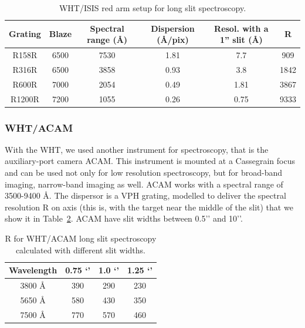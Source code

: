 \begin{table}
\begin{center}
\caption{WHT/ISIS red arm setup for long slit spectroscopy.}
\begin{tabular}{|c|c|c|c|c|c|}
\hline
Grating & Blaze & Spectral range (\AA) & Dispersion (\AA/pix) & Resol. with a 1'' slit (Å) & R \\ \hline
R158R	 & 6500 & 7530 & 1.81 & 7.7 & 909 \\ \hline
R316R	 & 6500 & 3858 & 0.93 & 3.8 & 1842 \\ \hline
R600R	 & 7000 & 2054 & 0.49 & 1.81 & 3867 \\ \hline
R1200R & 7200 & 1055 & 0.26 & 0.75 & 9333 \\ 
\hline
\end{tabular}
\label{tab2:isisr}
\end{center}
\end{table}


\subsubsection{WHT/ACAM}
\label{sec2:acam}

With the WHT, we used another instrument for spectroscopy, that is the auxiliary-port camera ACAM. This instrument is mounted at a  Cassegrain focus and can be used not only for low resolution spectroscopy, but for broad-band imaging, narrow-band imaging as well. ACAM works with a spectral range of 3500-9400 \AA. The dispersor is a VPH grating, modelled to deliver the spectral resolution R on axis (this is, with the target near the middle of the slit) that we show it in Table~\ref{tab2:acam}. ACAM have slit widths between 0.5’’ and 10’’.

\begin{table}
\begin{center}
\caption{R for WHT/ACAM long slit spectroscopy calculated with different slit widths.}
\begin{tabular}{|c|c|c|c|}
\hline
Wavelength & 0.75 ‘’ & 1.0 ‘’ & 1.25 ‘’ \\ \hline
3800 \AA & 390 & 290 & 230 \\ \hline
5650 \AA & 580 & 430 & 350 \\ \hline
7500 \AA & 770 & 570 & 460 \\ 
\hline
\end{tabular}
\label{tab2:acam}
\end{center}
\end{table}

